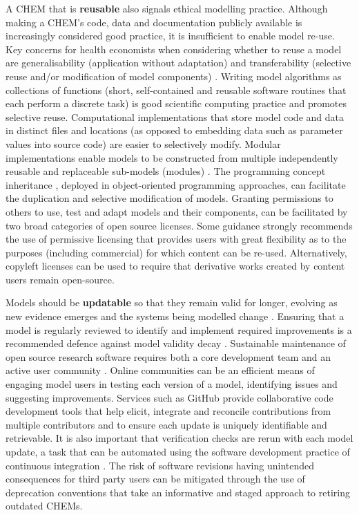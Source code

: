 \documentclass[sn-vancouver,Numbered,pdflatex]{sn-jnl}
\theoremstyle{remark}
\theoremstyle{definition}
\begin{document}
A CHEM that is \textbf{reusable} also signals ethical modelling practice. Although making a CHEM's code, data and documentation publicly available is increasingly considered good practice, it is insufficient to enable model re-use. Key concerns for health economists when considering whether to reuse a model are generalisability (application without adaptation) and transferability (selective reuse and/or modification of model components) \citep{RN39}. Writing model algorithms as collections of functions (short, self-contained and reusable software routines that each perform a discrete task) is good scientific computing practice \citep{Wilson_2017} and promotes selective reuse. Computational implementations that store model code and data in distinct files and locations (as opposed to embedding data such as parameter values into source code) are easier to selectively modify. Modular implementations enable models to be constructed from multiple independently reusable and replaceable sub-models (modules) \citep{pan2021modular}. The programming concept inheritance \citep{8717448}, deployed in object-oriented programming approaches, can facilitate the duplication and selective modification of models. Granting permissions to others to use, test and adapt models and their components, can be facilitated by two broad categories of open source licenses. Some guidance strongly recommends the use of permissive licensing \citep{Wilson_2017} that provides users with great flexibility as to the purposes (including commercial) for which content can be re-used. Alternatively, copyleft licenses \citep{copyleft2022} can be used to require that derivative works created by content users remain open-source.

Models should be \textbf{updatable} so that they remain valid for longer, evolving as new evidence emerges and the systems being modelled change \citep{Jenkins2021, garcia2021cost}. Ensuring that a model is regularly reviewed to identify and implement required improvements is a recommended defence against model validity decay \citep{calder2018computational}. Sustainable maintenance of open source research software requires both a core development team and an active user community \citep{info:doi/10.2196/20028}. Online communities can be an efficient means of engaging model users in testing each version of a model, identifying issues and suggesting improvements. Services such as GitHub \citep{github2007} provide collaborative code development tools \citep{MERGEL2015464} that help elicit, integrate and reconcile contributions from multiple contributors and to ensure each update is uniquely identifiable and retrievable. It is also important that verification checks are rerun with each model update, a task that can be automated using the software development practice of continuous integration \citep{CI2017}. The risk of software revisions having unintended consequences for third party users can be mitigated through the use of deprecation conventions \citep{zhou2016api} that take an informative and staged approach to retiring outdated CHEMs.
\end{document}
